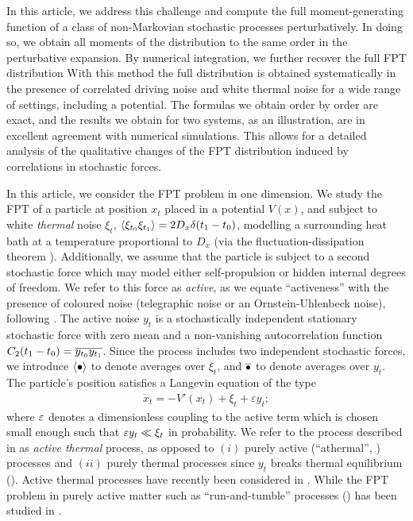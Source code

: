 \documentclass[%
 reprint,
superscriptaddress,
nofootinbib,
 amsmath,amssymb,
 aps,
prx,
]{revtex4-2}
\begin{document}
In this article, we address this challenge and compute the full moment-generating function of a class of non-Markovian stochastic processes perturbatively. In doing so, we obtain all moments of the distribution to the same order in the perturbative expansion. By numerical integration, we further recover the full FPT distribution With this method the full distribution is obtained systematically in the presence of correlated driving noise and white thermal noise for a wide range of settings, including a potential. The formulas we obtain order by order are exact, and the results we obtain for two systems, as an illustration, are in excellent agreement with numerical simulations. This allows for a detailed analysis of the qualitative changes of the FPT distribution  induced by correlations in stochastic forces. 

In this article, we consider the FPT problem in one dimension. 
We study the FPT of a particle at position $x_t$ placed in a potential $V(x)$, and subject to white \emph{thermal} noise $\xi_t$, $\left\langle {\xi_{t_0} \xi_{t_1}} \right\rangle = 2D_x \delta(t_1-t_0)$, modelling a surrounding heat bath at a temperature proportional to $D_x$ (via the fluctuation-dissipation theorem \cite{callen_irreversibility_1951,kubo_fluctuation-dissipation_1966}). Additionally, we assume that the particle is subject to a second stochastic force which may model either self-propulsion or hidden internal degrees of freedom. %
We refer to this force as \emph{active}, as we  equate ``activeness'' with the presence of coloured noise (\eg telegraphic noise or an Ornstein-Uhlenbeck noise), following \eg \cite{maggi_multidimensional_2015,fodor_how_2016,mandal_entropy_2017}.
The active noise $y_t$ is a stochastically independent stationary stochastic force with zero mean and a non-vanishing autocorrelation function $C_2(t_1-t_0) = \overline{y_{t_0}y_{t_1}}$. 
Since the process includes two independent stochastic forces, we introduce $\left\langle {\bullet} \right\rangle$ to denote averages over $\xi_t$, and $\overline{\bullet}$ to denote averages over $y_t$. 
The particle's position satisfies a Langevin equation \cite{kampen_stochastic_2007} of the type
\begin{align}
    \dot{x}_t = -V'(x_t) + \xi_t + \varepsilon y_t;
    \label{eq:driven_langevin}
\end{align}
where $\varepsilon$ denotes a dimensionless coupling to the active term which is chosen small enough such that $\varepsilon y_t \ll \xi_t$ in probability. We refer to the process described in  as \emph{active thermal} process, as opposed to $(i)$ purely active (``athermal'', \cite{szamel_stochastic_2019}) processes and $(ii)$ purely thermal processes since $y_t$ breaks thermal equilibrium (\cite{luczka_non-markovian_2005}). Active thermal processes have recently been considered in \eg \cite{malakar_steady_2018, caprini_entropy_2019,sevilla_generalized_2019,dabelow_irreversibility_2019}. While the FPT problem in purely active matter such as ``run-and-tumble'' processes (\cite{cates_diffusive_2012}) has been studied in \cite{dhar2019runandtumble}.  
\end{document}
